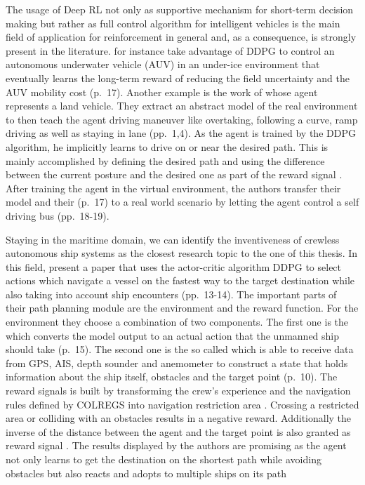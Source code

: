 \par
The usage of Deep RL not only as supportive mechanism for short-term decision making but rather as full control algorithm for intelligent vehicles is the main field of application for reinforcement in general and, 
as a consequence, is strongly present in the literature. \cite{wang2018reinforcement} for instance take advantage of DDPG to control an autonomous underwater vehicle (AUV) in an under-ice environment that eventually learns the long-term reward of reducing the field uncertainty and the AUV mobility cost (p.~17). Another example is the work of \cite{s18092905} whose agent represents a land vehicle. They extract an abstract model of the real environment to then teach the agent driving maneuver like overtaking, following a curve, ramp driving as well as staying in lane (pp.~1,4). As the agent is trained by the DDPG algorithm, he implicitly learns to drive on or near the desired path. This is mainly accomplished by defining the desired path and using the difference between the current posture and the desired one as part of the reward signal \cite[p.~4]{s18092905}. After training the agent in the virtual environment, the authors transfer their model and their  (p.~17) to a real world scenario by letting the agent control a self driving bus (pp.~18-19).
\par
Staying in the maritime domain, we can identify the inventiveness of crewless autonomous ship systems as the closest research topic to the one of this thesis. In this field, \cite{s20020426} present a paper that uses the actor-critic algorithm DDPG to select actions which navigate a vessel on the fastest way to the target destination while also taking into account ship encounters (pp.~13-14). The important parts of their path planning module are the environment and the reward function. For the environment they choose a combination of two components. The first one is the  which converts the model output to an actual action that the unmanned ship should take (p.~15). The second one is the so called  which is able to receive data from GPS, AIS, depth sounder and anemometer to construct a state that holds information about the ship itself, obstacles and the target point (p.~10). The reward signals is built by transforming the crew's experience and the navigation rules defined by COLREGS \cite[]{COLREG} into navigation restriction area \cite[p.~14]{s20020426}. Crossing a restricted area or colliding with an obstacles results in a negative reward. Additionally the inverse of the distance between the agent and the target point is also granted as reward signal \cite[p.~14]{s20020426}. The results displayed by the authors are promising as the agent not only learns to get the destination on the shortest path while avoiding obstacles but also reacts and adopts to multiple ships on its path

